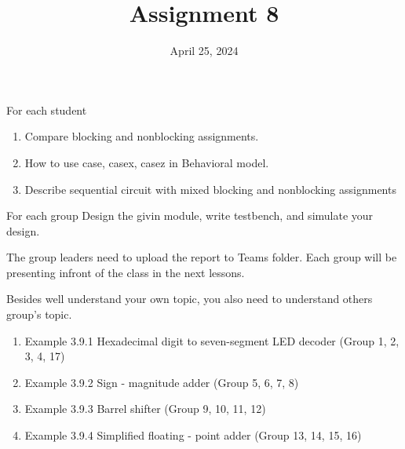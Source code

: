 \documentclass{vhdl-assignment}
\title{Assignment 8}
\date{April 25, 2024}
\begin{document}
\maketitle
\thispagestyle{fancy}

\begin{problem}{For each student}
    \begin{enumerate}
        \item Compare blocking and nonblocking assignments.
        \item How to use case, casex, casez in Behavioral model.
        \item Describe sequential circuit with mixed blocking and nonblocking assignments
    \end{enumerate}

\end{problem}

\begin{problem}{For each group}
    Design the givin module, write testbench, and simulate your design.

    The group leaders need to upload the report to Teams folder. Each group will be presenting infront of the class in the next lessons.

    Besides well understand your own topic, you also need to understand others group's topic.
    
    \begin{enumerate}
        \item Example 3.9.1 Hexadecimal digit to seven-segment LED decoder (Group 1, 2, 3, 4, 17)
        \item Example 3.9.2 Sign - magnitude adder (Group 5, 6, 7, 8)
        \item Example 3.9.3 Barrel shifter (Group 9, 10, 11, 12)
        \item Example 3.9.4 Simplified floating - point adder (Group 13, 14, 15, 16)
    \end{enumerate}


\end{problem}
\end{document}
